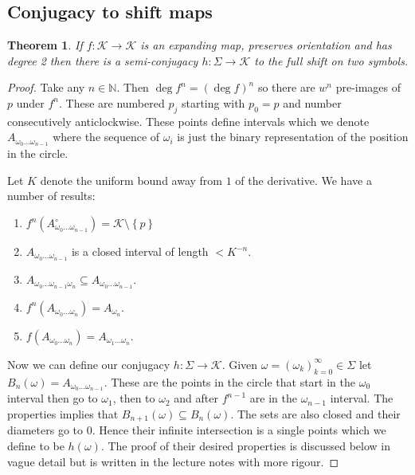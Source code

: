 \documentclass[11pt]{article}
\newcommand{\N}{\mathbb{N}}
\newtheorem{theorem}{Theorem}[section]
\begin{document}
\subsection{Conjugacy to shift maps}
\begin{theorem}
If $f:\mathcal{K}\to\mathcal{K}$ is an expanding map, preserves orientation and has degree 2 then there is a semi-conjugacy $h:\Sigma\to\mathcal{K}$ to the full shift on two symbols.

\begin{figure}[H]
	\centering
\end{figure}
\end{theorem}

\begin{proof}
Take any $n\in\N$.
Then $\deg f^n = (\deg f)^n$ so there are $w^n$ pre-images of $p$ under $f^n$.
These are numbered $p_j$ starting with $p_0=p$ and number consecutively anticlockwise.
These points define intervals which we denote $A_{\omega_0\dots\omega_{n-1}}$ where the sequence of $\omega_i$ is just the binary representation of the position in the circle.

Let $K$ denote the uniform bound away from $1$ of the derivative.
We have a number of results:
\begin{enumerate}
	\item $f^n(A_{\omega_0\dots\omega_{n-1}}^\circ)=\mathcal{K}\setminus\left\{p\right\}$
	\item $A_{\omega_0\dots\omega_{n-1}}$ is a closed interval of length $<K^{-n}$.
	\item $A_{\omega_0\dots\omega_{n-1}\omega_n}\subseteq A_{\omega_0\dots\omega_{n-1}}$.
	\item $f^n(A_{\omega_0\dots\omega_{n}})=A_{\omega_n}$.
	\item $f(A_{\omega_0\dots\omega_{n}})=A_{\omega_1\dots\omega_{n}}$.
\end{enumerate}

Now we can define our conjugacy $h:\Sigma\to\mathcal{K}$.
Given $\omega=(\omega_k)_{k=0}^\infty\in\Sigma$ let $B_n(\omega)=A_{\omega_0\dots\omega_{n-1}}$.
These are the points in the circle that start in the $\omega_0$ interval then go to $\omega_1$, then to $\omega_2$ and after $f^{n-1}$ are in the $\omega_{n-1}$ interval.
The properties implies that $B_{n+1}(\omega) \subseteq B_n(\omega)$.
The sets are also closed and their diameters go to $0$.
Hence their infinite intersection is a single points which we define to be $h(\omega)$.
The proof of their desired properties is discussed below in vague detail but is written in the lecture notes with more rigour.
\end{proof}
\end{document}
